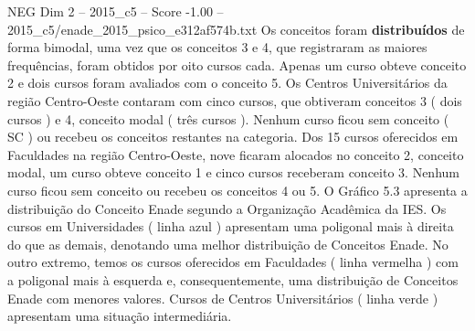 \begin{textsample}{NEG Dim 2 – 2015\_c5 – Score -1.00 – 2015\_c5/enade\_2015\_psico\_e312af574b.txt}
Os conceitos foram \textbf{distribuídos} de forma bimodal, uma vez que os conceitos 3 e 4, que registraram as maiores frequências, foram obtidos por oito cursos cada.
Apenas um curso obteve conceito 2 e dois cursos foram avaliados com o conceito 5.
Os Centros Universitários da região Centro-Oeste contaram com cinco cursos, que obtiveram conceitos 3 ( dois cursos ) e 4, conceito modal ( três cursos ).
Nenhum curso ficou sem conceito ( SC ) ou recebeu os conceitos restantes na categoria.
Dos 15 cursos oferecidos em Faculdades na região Centro-Oeste, nove ficaram alocados no conceito 2, conceito modal, um curso obteve conceito 1 e cinco cursos receberam conceito 3.
Nenhum curso ficou sem conceito ou recebeu os conceitos 4 ou 5.
O Gráfico 5.3 apresenta a distribuição do Conceito Enade segundo a Organização Acadêmica da IES.
Os cursos em Universidades ( linha azul ) apresentam uma poligonal mais à direita do que as demais, denotando uma melhor distribuição de Conceitos Enade.
No outro extremo, temos os cursos oferecidos em Faculdades ( linha vermelha ) com a poligonal mais à esquerda e, consequentemente, uma distribuição de Conceitos Enade com menores valores.
Cursos de Centros Universitários ( linha verde ) apresentam uma situação intermediária.

\end{textsample}
